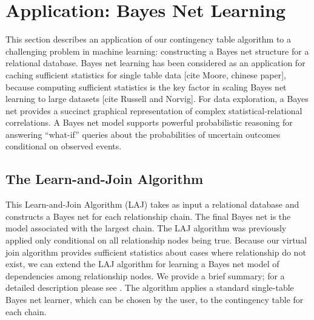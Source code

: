 \documentclass{vldb}
\begin{document}
\section{Application: Bayes Net  Learning }

This section describes an application of our contingency table algorithm to a challenging problem in machine learning: constructing a Bayes net structure for a relational database. Bayes net learning has been considered as an application for caching sufficient statistics for single table data [cite Moore, chinese paper], because computing sufficient statistics is the key factor in scaling Bayes net learning to large datasets [cite Russell and Norvig]. For data exploration, a Bayes net provides a succinct graphical representation of complex statistical-relational correlations. A  Bayes net model supports powerful probabilistic reasoning for answering ``what-if'' queries about the probabilities of uncertain outcomes conditional on observed events. 

\subsection{The Learn-and-Join Algorithm} \label{sec:laj}
This Learn-and-Join Algorithm (LAJ)  takes as input a relational database and constructs a Bayes net for each relationship chain. The final Bayes net is the model associated with the largest chain. The LAJ algorithm was previously applied only conditional on all relationship nodes being true. Because our virtual join algorithm provides sufficient statistics about cases where relationship  do not exist, we can extend the LAJ algorithm for learning a Bayes net model of dependencies among relationship nodes. We provide a brief summary; for a detailed description please see \cite{Schulte2011}. The algorithm applies a standard single-table Bayes net learner, which can be chosen by the user, to the contingency table for each chain. 
\end{document}
